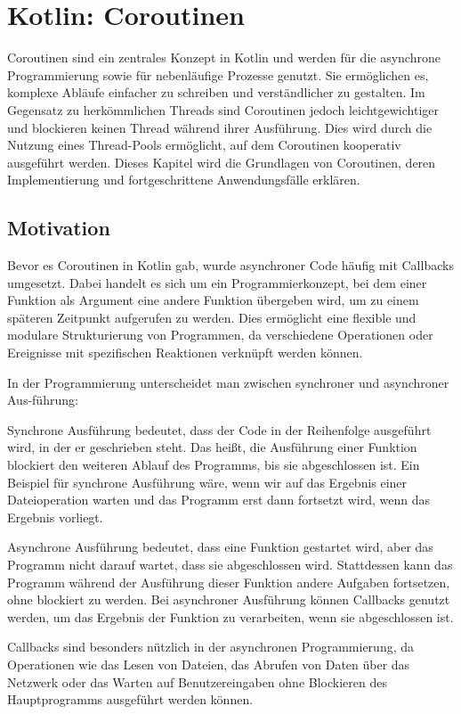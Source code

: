 \documentclass[fontsize=12pt,paper=a4,twoside=semi,parskip=half-,headsepline,headinclude]{scrreprt}
\begin{document}
\section{Kotlin: Coroutinen}

Coroutinen sind ein zentrales Konzept in Kotlin und werden für die asynchrone Programmierung sowie für nebenläufige Prozesse genutzt. Sie ermöglichen es, komplexe Abläufe einfacher zu schreiben und verständlicher zu gestalten. Im Gegensatz zu herkömmlichen Threads sind Coroutinen jedoch leichtgewichtiger und blockieren keinen Thread während ihrer Ausführung. Dies wird durch die Nutzung eines Thread-Pools ermöglicht, auf dem Coroutinen kooperativ ausgeführt werden. Dieses Kapitel wird die Grundlagen von Coroutinen, deren Implementierung und fortgeschrittene Anwendungsfälle erklären.

\subsection{Motivation}

Bevor es Coroutinen in Kotlin gab, wurde asynchroner Code häufig mit Callbacks umgesetzt. Dabei handelt es sich um ein Programmierkonzept, bei dem einer Funktion als Argument eine andere Funktion übergeben wird, um zu einem späteren Zeitpunkt aufgerufen zu werden. Dies ermöglicht eine flexible und modulare Strukturierung von Programmen, da verschiedene Operationen oder Ereignisse mit spezifischen Reaktionen verknüpft werden können. 

In der Programmierung unterscheidet man zwischen synchroner und asynchroner Aus-führung:

Synchrone Ausführung bedeutet, dass der Code in der Reihenfolge ausgeführt wird, in der er geschrieben steht. Das heißt, die Ausführung einer Funktion blockiert den weiteren Ablauf des Programms, bis sie abgeschlossen ist. Ein Beispiel für synchrone Ausführung wäre, wenn wir auf das Ergebnis einer Dateioperation warten und das Programm erst dann fortsetzt wird, wenn das Ergebnis vorliegt.

Asynchrone Ausführung bedeutet, dass eine Funktion gestartet wird, aber das Programm nicht darauf wartet, dass sie abgeschlossen wird. Stattdessen kann das Programm während der Ausführung dieser Funktion andere Aufgaben fortsetzen, ohne blockiert zu werden. Bei asynchroner Ausführung können Callbacks genutzt werden, um das Ergebnis der Funktion zu verarbeiten, wenn sie abgeschlossen ist.

Callbacks sind besonders nützlich in der asynchronen Programmierung, da Operationen wie das Lesen von Dateien, das Abrufen von Daten über das Netzwerk oder das Warten auf Benutzereingaben ohne Blockieren des Hauptprogramms ausgeführt werden können.
\end{document}
